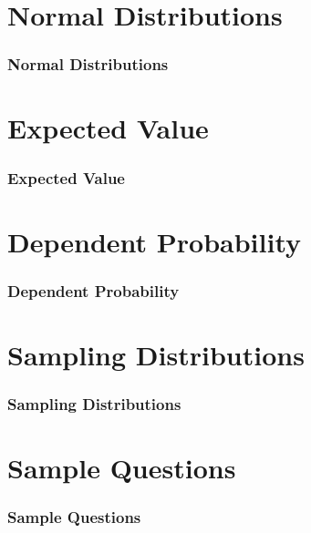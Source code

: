 \documentclass{beamer}
\begin{document}
    \section{Normal Distributions}

    \begin{frame}
        \frametitle{Normal Distributions}
    \end{frame}

    \section{Expected Value}

    \begin{frame}
        \frametitle{Expected Value}
    \end{frame}
    
    \section{Dependent Probability}

    \begin{frame}
        \frametitle{Dependent Probability}
    \end{frame}

    \section{Sampling Distributions}

    \begin{frame}
        \frametitle{Sampling Distributions}
    \end{frame}

    \section{Sample Questions}

    \begin{frame}
        \frametitle{Sample Questions}
    \end{frame}
\end{document}
